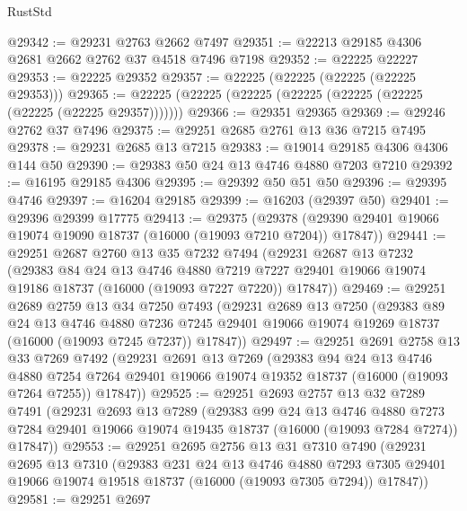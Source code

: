 \begin{lexlean}{RustStd}
\begin{coremodule}
@29342 := @29231 @2763 @2662 @7497
@29351 := @22213 @29185 @4306 @2681 @2662 @2762 @37 @4518 @7496 @7198
@29352 := @22225 @22227
@29353 := @22225 @29352
@29357 := @22225 (@22225 (@22225 (@22225 @29353)))
@29365 := @22225 (@22225 (@22225 (@22225 (@22225 (@22225 (@22225 (@22225 @29357)))))))
@29366 := @29351 @29365
@29369 := @29246 @2762 @37 @7496
@29375 := @29251 @2685 @2761 @13 @36 @7215 @7495
@29378 := @29231 @2685 @13 @7215
@29383 := @19014 @29185 @4306 @4306 @144 @50
@29390 := @29383 @50 @24 @13 @4746 @4880 @7203 @7210
@29392 := @16195 @29185 @4306
@29395 := @29392 @50 @51 @50
@29396 := @29395 @4746
@29397 := @16204 @29185
@29399 := @16203 (@29397 @50)
@29401 := @29396 @29399 @17775
@29413 := @29375
    (@29378 (@29390 @29401 @19066 @19074 @19090 @18737 (@16000 (@19093 @7210 @7204)) @17847))
@29441 := @29251
    @2687
    @2760
    @13
    @35
    @7232
    @7494
    (@29231
      @2687
      @13
      @7232
      (@29383
        @84
        @24
        @13
        @4746
        @4880
        @7219
        @7227
        @29401
        @19066
        @19074
        @19186
        @18737
        (@16000 (@19093 @7227 @7220))
        @17847))
@29469 := @29251
    @2689
    @2759
    @13
    @34
    @7250
    @7493
    (@29231
      @2689
      @13
      @7250
      (@29383
        @89
        @24
        @13
        @4746
        @4880
        @7236
        @7245
        @29401
        @19066
        @19074
        @19269
        @18737
        (@16000 (@19093 @7245 @7237))
        @17847))
@29497 := @29251
    @2691
    @2758
    @13
    @33
    @7269
    @7492
    (@29231
      @2691
      @13
      @7269
      (@29383
        @94
        @24
        @13
        @4746
        @4880
        @7254
        @7264
        @29401
        @19066
        @19074
        @19352
        @18737
        (@16000 (@19093 @7264 @7255))
        @17847))
@29525 := @29251
    @2693
    @2757
    @13
    @32
    @7289
    @7491
    (@29231
      @2693
      @13
      @7289
      (@29383
        @99
        @24
        @13
        @4746
        @4880
        @7273
        @7284
        @29401
        @19066
        @19074
        @19435
        @18737
        (@16000 (@19093 @7284 @7274))
        @17847))
@29553 := @29251
    @2695
    @2756
    @13
    @31
    @7310
    @7490
    (@29231
      @2695
      @13
      @7310
      (@29383
        @231
        @24
        @13
        @4746
        @4880
        @7293
        @7305
        @29401
        @19066
        @19074
        @19518
        @18737
        (@16000 (@19093 @7305 @7294))
        @17847))
@29581 := @29251
    @2697

\end{coremodule}
\end{lexlean}
